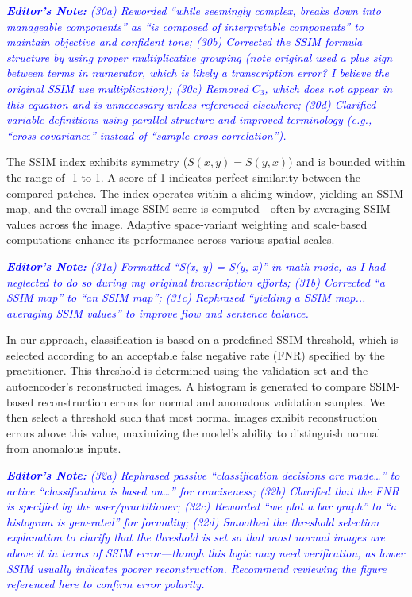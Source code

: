 \documentclass[journal,12pt,onecolumn,draftcls]{IEEEtran}
\newcommand{\editornote}[1]{\par\textit{\textcolor{blue}{\textbf{Editor's Note:} #1}}\par}
\begin{document}
\editornote{(30a) Reworded “while seemingly complex, breaks down into manageable components” as “is composed of interpretable components” to maintain objective and confident tone; 
(30b) Corrected the SSIM formula structure by using proper multiplicative grouping (note original used a plus sign between terms in numerator, which is likely a transcription error? I believe the original SSIM use multiplication); 
(30c) Removed $C_3$, which does not appear in this equation and is unnecessary unless referenced elsewhere; 
(30d) Clarified variable definitions using parallel structure and improved terminology (e.g., “cross-covariance” instead of “sample cross-correlation”).}

The SSIM index exhibits symmetry ($S(x, y) = S(y, x)$) and is bounded within the range of -1 to 1. A score of 1 indicates perfect similarity between the compared patches. The index operates within a sliding window, yielding an SSIM map, and the overall image SSIM score is computed—often by averaging SSIM values across the image. Adaptive space-variant weighting and scale-based computations enhance its performance across various spatial scales.

\editornote{(31a) Formatted “S(x, y) = S(y, x)” in math mode, as I had neglected to do so during my original transcription efforts; 
(31b) Corrected “a SSIM map” to “an SSIM map”; 
(31c) Rephrased “yielding a SSIM map... averaging SSIM values” to improve flow and sentence balance.}

In our approach, classification is based on a predefined SSIM threshold, which is selected according to an acceptable false negative rate (FNR) specified by the practitioner. This threshold is determined using the validation set and the autoencoder’s reconstructed images. A histogram is generated to compare SSIM-based reconstruction errors for normal and anomalous validation samples. We then select a threshold such that most normal images exhibit reconstruction errors above this value, maximizing the model’s ability to distinguish normal from anomalous inputs.

\editornote{(32a) Rephrased passive “classification decisions are made…” to active “classification is based on…” for conciseness; 
(32b) Clarified that the FNR is specified by the user/practitioner; 
(32c) Reworded “we plot a bar graph” to “a histogram is generated” for formality; 
(32d) Smoothed the threshold selection explanation to clarify that the threshold is set so that most normal images are above it in terms of SSIM error—though this logic may need verification, as lower SSIM usually indicates poorer reconstruction. Recommend reviewing the figure referenced here to confirm error polarity.}
\end{document}
